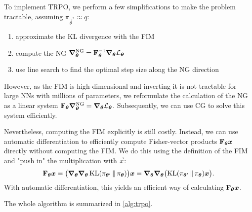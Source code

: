 			To implement \ac{TRPO}, we perform a few simplifications to make the problem tractable, assuming \( \pi_{\vec{\theta}^\ast} \approx q \):
			\begin{enumerate}
				\item approximate the \ac{KL} divergence with the \ac{FIM}
				\item compute the \ac{NG} \( \grad_{\bm{\theta}}^\mathrm{NG} = \bm{\mathrm{F}}_{\bm{\theta}}^{-1} \grad_{\bm{\theta}} \mathcal{L}_{\bm{\theta}} \)
				\item use line search to find the optimal step size along the \ac{NG} direction
			\end{enumerate}
			However, as the \ac{FIM} is high-dimensional and inverting it is not tractable for large \acp{NN} with millions of parameters, we reformulate the calculation of the \ac{NG} as a linear system \( \bm{\mathrm{F}}_{\bm{\theta}} \grad_{\bm{\theta}}^\mathrm{NG} = \grad_{\bm{\theta}} \mathcal{L}_{\bm{\theta}} \). Subsequently, we can use \ac{CG} to solve this system efficiently.

			Nevertheless, computing the \ac{FIM} explicitly is still costly. Instead, we can use automatic differentiation to efficiently compute Fisher-vector products \( \bm{\mathrm{F}}_{\bm{\theta}} \bm{x} \) directly without computing the \ac{FIM}. We do this using the definition of the \ac{FIM} and "push in" the multiplication with \(\vec{x}\):
			\begin{equation}
				\bm{\mathrm{F}}_{\bm{\theta}} \bm{x}
				= \bigl( \grad_{\bm{\theta}} \grad_{\bm{\theta}} \operatorname{KL}(\pi_{\bm{\theta}'} \,\Vert\, \pi_{\bm{\theta}}) \bigr) \bm{x}
				= \grad_{\bm{\theta}} \grad_{\bm{\theta}} \bigl( \operatorname{KL}(\pi_{\bm{\theta}'} \,\Vert\, \pi_{\bm{\theta}}) \bm{x} \bigr).
			\end{equation}
			With automatic differentiation, this yields an efficient way of calculating \( \bm{\mathrm{F}}_{\bm{\theta}} \bm{x} \).

			The whole algorithm is summarized in \autoref{alg:trpo}.

